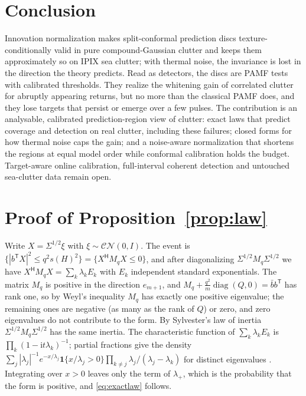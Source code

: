 \documentclass[journal]{IEEEtran}
\begin{document}
\section{Conclusion}
Innovation normalization makes split-conformal prediction discs texture-conditionally valid in pure compound-Gaussian clutter and keeps them approximately so on IPIX sea clutter; with thermal noise, the invariance is lost in the direction the theory predicts. Read as detectors, the discs are PAMF tests with calibrated thresholds. They realize the whitening gain of correlated clutter for abruptly appearing returns, but no more than the classical PAMF does, and they lose targets that persist or emerge over a few pulses. The contribution is an analysable, calibrated prediction-region view of clutter: exact laws that predict coverage and detection on real clutter, including these failures; closed forms for how thermal noise caps the gain; and a noise-aware normalization that shortens the regions at equal model order while conformal calibration holds the budget. Target-aware online calibration, full-interval coherent detection and untouched sea-clutter data remain open.

\appendices
\section{Proof of Proposition~\ref{prop:law}}\label{app:law}
Write $X=\Sigma^{1/2}\xi$ with $\xi\sim\mathcal{CN}(0,I)$. The event is $\{|b^{\mathsf T}X|^2\le q^2s(H)^2\}=\{X^{\mathsf H}M_qX\le0\}$, and after diagonalizing $\Sigma^{1/2}M_q\Sigma^{1/2}$ we have $X^{\mathsf H}M_qX=\sum_k\lambda_kE_k$ with $E_k$ independent standard exponentials. The matrix $M_q$ is positive in the direction $e_{m+1}$, and $M_q+\frac{q^2}{m}\operatorname{diag}(Q,0)=\bar bb^{\mathsf T}$ has rank one, so by Weyl's inequality $M_q$ has exactly one positive eigenvalue; the remaining ones are negative (as many as the rank of $Q$) or zero, and zero eigenvalues do not contribute to the form. By Sylvester's law of inertia $\Sigma^{1/2}M_q\Sigma^{1/2}$ has the same inertia. The characteristic function of $\sum_k\lambda_kE_k$ is $\prod_k(1-\mathrm i t\lambda_k)^{-1}$; partial fractions give the density $\sum_j|\lambda_j|^{-1}e^{-x/\lambda_j}\mathbf 1\{x/\lambda_j>0\}\prod_{k\ne j}\lambda_j/(\lambda_j-\lambda_k)$ for distinct eigenvalues \cite{alnaffouri2016}. Integrating over $x>0$ leaves only the term of $\lambda_+$, which is the probability that the form is positive, and \eqref{eq:exactlaw} follows.
\end{document}
